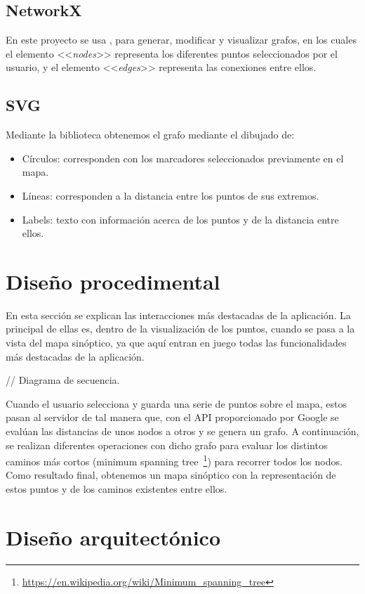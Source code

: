 \subsection{NetworkX}
En este proyecto se usa , para generar, modificar y visualizar grafos, en los cuales el elemento <<\textit{nodes}>> representa los diferentes puntos seleccionados por el usuario, y el elemento <<\textit{edges}>> representa las conexiones entre ellos.


\subsection{SVG}
Mediante la biblioteca  obtenemos el grafo mediante el dibujado de:
\begin{itemize}
	\item Círculos: corresponden con los marcadores seleccionados previamente en el mapa.
	\item Líneas: corresponden a la distancia entre los puntos de sus extremos.
	\item Labels: texto con información acerca de los puntos y de la distancia entre ellos.
\end{itemize}


\section{Diseño procedimental}
En esta sección se explican las interacciones más destacadas de la aplicación. La principal de ellas es, dentro de la visualización de los puntos, cuando se pasa a la vista del mapa sinóptico, ya que aquí entran en juego todas las funcionalidades más destacadas de la aplicación.


// Diagrama de secuencia.


Cuando el usuario selecciona y guarda una serie de puntos sobre el mapa, estos pasan al servidor de tal manera que, con el API proporcionado por Google se evalúan las distancias de unos nodos a otros y se genera un grafo. A continuación, se realizan diferentes operaciones con dicho grafo para evaluar los distintos caminos más cortos (minimum spanning tree~\footnote{\url{https://en.wikipedia.org/wiki/Minimum_spanning_tree}}) para recorrer todos los nodos.
\\


Como resultado final, obtenemos un mapa sinóptico con la representación de estos puntos y de los caminos existentes entre ellos.


\section{Diseño arquitectónico}

